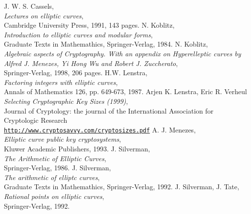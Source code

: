 \newpage
\begin{thebibliography}{99999}

     J. W. S. Cassels,
	 \\
        {\em Lectures on elliptic curves},\\
	Cambridge University Press, 1991, 143 pages.
    N. Koblitz, 
	 \\
        {\em Introduction to elliptic curves and modular forms},\\
	Graduate Texts in Mathemathics, Springer-Verlag, 1984.
    N. Koblitz,  
	\\
	{\em Algebraic aspects of Cryptography. With an appendix on 
	Hyperelleptic curves by Alfred J. Menezes, Yi Hong Wu and Robert 
	J. Zuccherato}, \\
	Springer-Verlag, 1998, 206 pages.
     H.W. Lenstra, 
         \\
        {\em Factoring integers with elliptic curves}, \\
	Annals of Mathematics 126, pp. 649-673, 1987.
     Arjen K. Lenstra, Eric R. Verheul
         \\
        {\em Selecting Cryptographic Key Sizes (1999)},\\
	Journal of Cryptology: the journal of the International 
	Association for Cryptologic Research \\
	\href{http://www.cryptosavvy.com/cryptosizes.pdf}
	{\texttt{http://www.cryptosavvy.com/cryptosizes.pdf}}
    A. J. Menezes, 
	 \\
        {\em Elliptic curve public key cryptosystems},\\
	Kluwer Academic Publishers, 1993.
     J. Silverman, 
        \\
        {\em The Arithmetic of Elliptic Curves},\\
	Springer-Verlag, 1986.
    J. Silverman,
	 \\
        {\em The arithmetic of elliptc curves},\\
	Graduate Texts in Mathemathics, Springer-Verlag, 1992.
    J. Silverman, J. Tate,
	 \\
        {\em Rational points on elliptic curves},\\
	Springer-Verlag, 1992.

\end{thebibliography}



